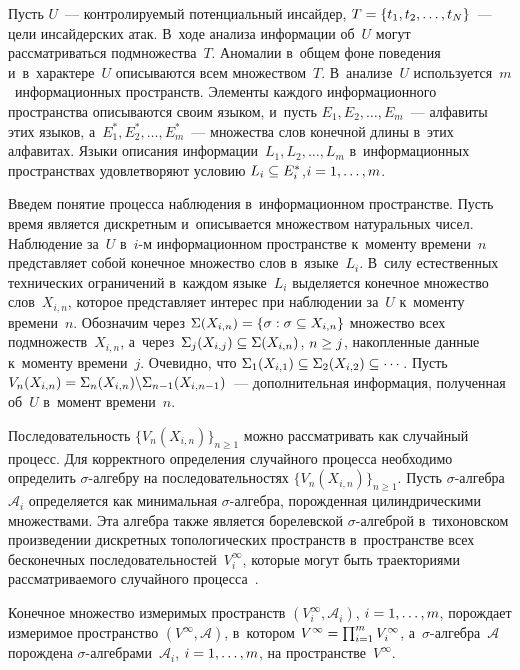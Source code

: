 \begin{multicols}{2}
  Пусть $U$~--- контролируемый потенциальный инсайдер, $T\hm= \{t_1, 
t_2,\ldots , t_N\}$~--- цели инсайдерских атак. В~ходе анализа информации 
об~$U$ могут рассматриваться подмножества~$T$. Аномалии в~общем фоне 
поведения и~в~характере~$U$ описываются всем множеством~$T$. 
В~анализе~$U$ используется~$m$~информационных пространств. Элементы 
каждого информационного пространства описываются своим языком, и~пусть 
$E_1, E_2,\ldots, E_m$~--- алфавиты этих языков, а~$E_1^*, E_2^*, \ldots , 
E_m^*$~--- множества слов конечной длины в~этих алфавитах. Языки описания 
информации~$L_1, L_2,\ldots , L_m$ в~информационных пространствах 
удовлетворяют условию $L_i\hm\subseteq E_i^*$,\linebreak $i\hm=1,\ldots , m$. 
  
  Введем понятие процесса наблюдения в~информационном пространстве. 
Пусть время является дискретным и~описывается множеством натуральных 
чисел. Наблюдение за~$U$ в~$i$-м информацион\-ном пространстве к~моменту 
времени~$n$ пред\-став\-ля\-ет собой конечное множество слов в~языке~$L_i$.\linebreak 
В~силу естественных технических ограничений в~каж\-дом языке~$L_i$ 
выделяется конечное множество слов~$X_{i,n}$, которое представляет интерес 
при наблюдении за~$U$ к~моменту времени~$n$. Обозначим через 
$\Sigma(X_{i,n})\hm= \{ \sigma: \sigma\subseteq X_{i,n}\}$ множество всех 
подмножеств~$X_{i,n}$, а~через~$\Sigma_j (X_{i,j})\hm\subseteq 
\Sigma(X_{i,n})$, $n\hm\geq j$, накопленные данные к~моменту времени~$j$. 
Очевидно, что $\Sigma_1(X_{i,1})\hm\subseteq \Sigma_2(X_{i,2})\subseteq 
\cdots$. Пусть $V_n(X_{i,n})\hm= \Sigma_n(X_{i,n})\backslash  
\Sigma_{n-1}(X_{i,n-1})$~--- дополнительная информация, полученная об~$U$ 
в~момент времени~$n$. 
  
  Последовательность $\{ V_n(X_{i,n})\}_{n\geq 1}$ можно рассматривать как 
случайный процесс. Для корректного определения случайного процесса 
необходимо определить $\sigma$-ал\-геб\-ру на последовательностях 
$\{V_n(X_{i,n})\}_{n\geq 1}$. Пусть $\sigma$-ал\-геб\-ра~$\mathcal{A}_i$ 
определяется как минимальная $\sigma$-ал\-геб\-ра, порожденная 
цилиндрическими множествами. Эта алгебра также является борелевской  
$\sigma$-ал\-геб\-рой в~тихоновском произведении дискретных топологических 
пространств в~пространстве всех бесконечных 
последовательностей~$V_i^\infty$, которые могут быть траекториями 
рассматриваемого случайного процесса~\cite{7-gr, 8-gr}.
  
  Конечное множество измеримых пространств $(V_i^\infty, \mathcal{A}_i)$, 
$i\hm= 1,\ldots ,m$, порождает измеримое пространство $(V^\infty, \mathcal{A})$, 
в~котором $V^\infty\hm= \prod\nolimits_{i=1}^m V_i^\infty$,\linebreak  
а~$\sigma$-ал\-геб\-ра~$\mathcal{A}$ порождена  
$\sigma$-ал\-геб\-ра\-ми~$\mathcal{A}_i$, $i\hm= 1,\ldots , m$, на 
пространстве~$V^\infty$. 
  

\end{multicols}
